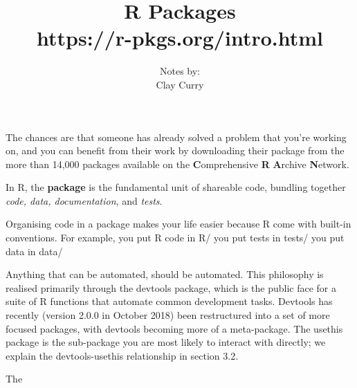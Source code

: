 \documentclass[11pt]{article} %
\title{R Packages \\ https://r-pkgs.org/intro.html}
\author{Notes by:  \\ Clay Curry}
\date{}
\begin{document}
\maketitle

The chances are that someone has already solved a problem that you're working on, and you can benefit from their work by downloading their package from the more than 14,000 packages available on the \textbf{C}omprehensive \textbf{R} \textbf{A}rchive \textbf{N}etwork.

{In R, the \textbf{package} is the fundamental unit of shareable code, bundling together \textit{code, data, documentation}, and \textit{tests}.}

Organising code in a package makes your life easier because R come with built-in conventions. For example,
\points
{you put R code in R/}
{you put tests in tests/}
{you put data in data/}


Anything that can be automated, should be automated. This philosophy is realised primarily through the devtools package, which is the public face for a suite of R functions that automate common development tasks. Devtools has recently (version 2.0.0 in October 2018) been restructured into a set of more focused packages, with devtools becoming more of a meta-package. The usethis package is the sub-package you are most likely to interact with directly; we explain the devtools-usethis relationship in section 3.2.

The 
\end{document}
